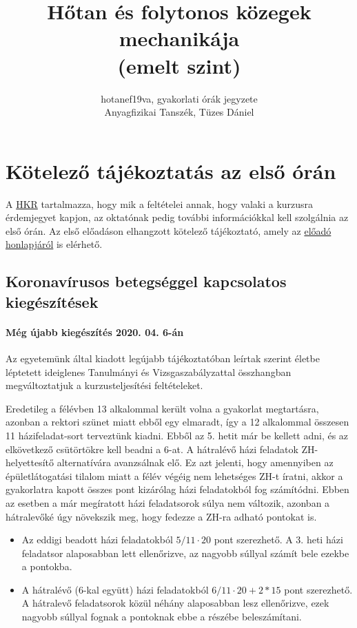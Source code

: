 \documentclass[12pt,a4paper]{scrartcl}
\begin{document}
\title{Hőtan és folytonos közegek mechanikája\\(emelt szint)}
\author{hotanef19va, gyakorlati órák jegyzete\\Anyagfizikai Tanszék, Tüzes Dániel}
\maketitle
\tableofcontents
\section*{Kötelező tájékoztatás az első órán}
A \href{https://www.elte.hu/file/ELTE_SZMSZ_II.pdf}{HKR} tartalmazza, hogy mik a feltételei annak, hogy valaki a kurzusra érdemjegyet kapjon, az oktatónak pedig további információkkal kell szolgálnia az első órán. Az első előadáson elhangzott kötelező tájékoztató, amely az \href{http://ispanovity.web.elte.hu/teaching/}{előadó honlapjáról} is elérhető.

\subsection{Koronavírusos betegséggel kapcsolatos kiegészítések}
\paragraph{Még újabb kiegészítés 2020. 04. 6-án}
Az egyetemünk által kiadott legújabb tájékoztatóban leírtak szerint életbe léptetett ideiglenes Tanulmányi és Vizsgaszabályzattal összhangban megváltoztatjuk a kurzusteljesítési feltételeket.

Eredetileg a félévben 13 alkalommal került volna a gyakorlat megtartásra, azonban a rektori szünet miatt ebből egy elmaradt, így a 12 alkalommal összesen 11 házifeladat-sort terveztünk kiadni. Ebből az 5. hetit már be kellett adni, és az elkövetkező csütörtökre kell beadni a 6-at. A hátralévő házi feladatok ZH-helyettesítő alternatívára avanzsálnak elő. Ez azt jelenti, hogy amennyiben az épületlátogatási tilalom miatt a félév végéig nem lehetséges ZH-t íratni, akkor a gyakorlatra kapott összes pont kizárólag házi feladatokból fog számítódni. Ebben az esetben a már megíratott házi feladatsorok súlya nem változik, azonban a hátralevőké úgy növekszik meg, hogy fedezze a ZH-ra adható pontokat is.
\begin{itemize}
\item Az eddigi beadott házi feladatokból $5/11 \cdot  20$ pont szerezhető. A 3. heti házi feladatsor alaposabban lett ellenőrizve, az nagyobb súllyal számít bele ezekbe a pontokba.
\item A hátralévő (6-kal együtt) házi feladatokból $6/11 \cdot 20 + 2 * 15$ pont szerezhető. A hátralevő feladatsorok közül néhány alaposabban lesz ellenőrizve, ezek nagyobb súllyal fognak a pontoknak ebbe a részébe beleszámítani.
\end{itemize}
\end{document}
